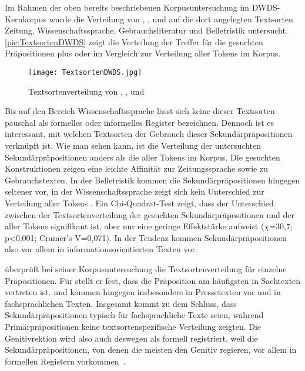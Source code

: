 Im Rahmen der oben bereits beschriebenen Korpusuntersuchung im DWDS-Kernkorpus \citep[s.][]{Vieregge.2019} wurde die Verteilung von \waehrend, \dank,  und  auf die dort angelegten Textsorten \glqq Zeitung\grqq, \glqq Wissenschaftssprache\grqq, \glqq Gebrauchsliteratur\grqq{} und \glqq Belletristik\grqq{} untersucht. 
\autoref{pic:TextsortenDWDS} zeigt die Verteilung der Treffer für die gesuchten Präpositionen plus  oder  im Vergleich zur Verteilung aller Tokens im Korpus.
\begin{figure}
\centering
\texttt{[image: TextsortenDWDS.jpg]}
\caption{Textsortenverteilung von \waehrend, \dank,  und  \citep[s.][]{Vieregge.2019}}
\label{pic:TextsortenDWDS}
\end{figure}

Bis auf den Bereich Wissenschaftssprache lässt sich keine dieser Textsorten pauschal als formelles oder informelles Register bezeichnen. 
Dennoch ist es interessant, mit welchen Textsorten der Gebrauch dieser Sekundärpräpositionen verknüpft ist. 
Wie man sehen kann, ist die Verteilung der untersuchten Sekundärpräpositionen anders als die aller Tokens im Korpus. 
Die gesuchten Konstruktionen zeigen eine leichte Affinität zur Zeitungssprache sowie zu Gebrauchstexten. 
In der Belletristik kommen die Sekundärpräpositionen hingegen seltener vor, in der Wissenschaftssprache zeigt sich kein Unterschied zur Verteilung aller Tokens \citep[s.][]{Vieregge.2019}. 
Ein Chi-Quadrat-Test zeigt, dass der Unterschied zwischen der Textsortenverteilung der gesuchten Sekundärpräpositionen und der aller Tokens signifikant ist, aber nur eine geringe Effektstärke aufweist ($\chi$=30,7; p<0,001; Cramer's V=0,071).
In der Tendenz kommen Sekundärpräpositionen also vor allem in informationsorientierten Texten vor.

\citet[176--184]{DiMeola2000} überprüft bei seiner Korpusuntersuchung die Textsortenverteilung für einzelne Präpositionen. 
Für \waehrend{} stellt er fest, dass die Präposition am häufigsten in Sachtexten vertreten ist.
 und \dank{} kommen hingegen insbesondere in Pressetexten vor und \gegenueber{} in fachsprachlichen Texten. 
Insgesamt kommt \citet[184]{DiMeola2000} zu dem Schluss, dass Sekundärpräpositionen typisch für fachsprachliche Texte seien, während Primärpräpositionen keine textsortenspezifische Verteilung zeigten. 
Die Genitivrektion wird also auch deswegen als formell registriert, weil die Sekund{\"a}rpr{\"a}positionen, von denen die meisten den Genitiv regieren, vor allem in formellen Registern vorkommen~\citep[s.][209]{Becker2011}. 

